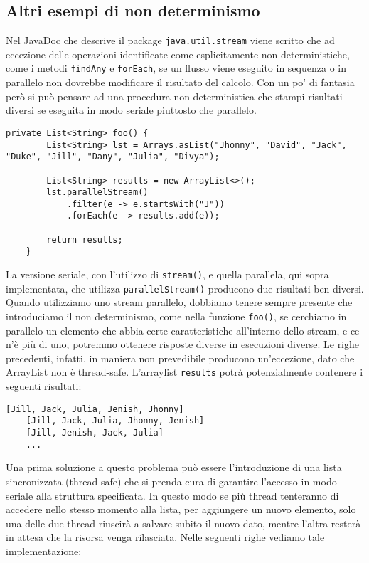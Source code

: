 						
		\subsection{Altri esempi di non determinismo}
		\label{esempi-non-det}
			Nel JavaDoc che descrive il package \lstinline|java.util.stream| viene scritto che ad eccezione delle operazioni identificate come esplicitamente non deterministiche, come i metodi \lstinline|findAny| e \lstinline|forEach|, se un flusso viene eseguito in sequenza o in parallelo non dovrebbe modificare il risultato del calcolo. Con un po' di fantasia però si può pensare ad una procedura non deterministica che stampi risultati diversi se eseguita in modo seriale piuttosto che parallelo.
			\begin{lstlisting}[breaklines=true]
	private List<String> foo() {
		List<String> lst = Arrays.asList("Jhonny", "David", "Jack", "Duke", "Jill", "Dany", "Julia", "Divya");
	
		List<String> results = new ArrayList<>();
		lst.parallelStream()
			.filter(e -> e.startsWith("J"))
			.forEach(e -> results.add(e));
			
		return results;
	}
			\end{lstlisting}
			La versione seriale, con l'utilizzo di \lstinline|stream()|, e quella parallela, qui sopra implementata, che utilizza \lstinline|parallelStream()| producono due risultati ben diversi. Quando utilizziamo uno stream parallelo, dobbiamo tenere sempre presente che introduciamo il non determinismo, come nella funzione \lstinline|foo()|, se cerchiamo in parallelo un elemento che abbia certe caratteristiche all'interno dello stream, e ce n'è più di uno, potremmo ottenere risposte diverse in esecuzioni diverse. Le righe precedenti, infatti, in maniera non prevedibile producono un'eccezione, dato che ArrayList non è thread-safe. L'arraylist \lstinline|results| potrà potenzialmente contenere i seguenti risultati:
			\begin{lstlisting}[numbers=none,frame=none]
	[Jill, Jack, Julia, Jenish, Jhonny]
	[Jill, Jack, Julia, Jhonny, Jenish]
	[Jill, Jenish, Jack, Julia]
	...
			\end{lstlisting}
			Una prima soluzione a questo problema può essere l'introduzione di una lista sincronizzata (thread-safe) che si prenda cura di garantire l'accesso in modo seriale alla struttura specificata. In questo modo se più thread tenteranno di accedere nello stesso momento alla lista, per aggiungere un nuovo elemento, solo una delle due thread riuscirà a salvare subito il nuovo dato, mentre l'altra resterà in attesa che la risorsa venga rilasciata. Nelle seguenti righe vediamo tale implementazione:
